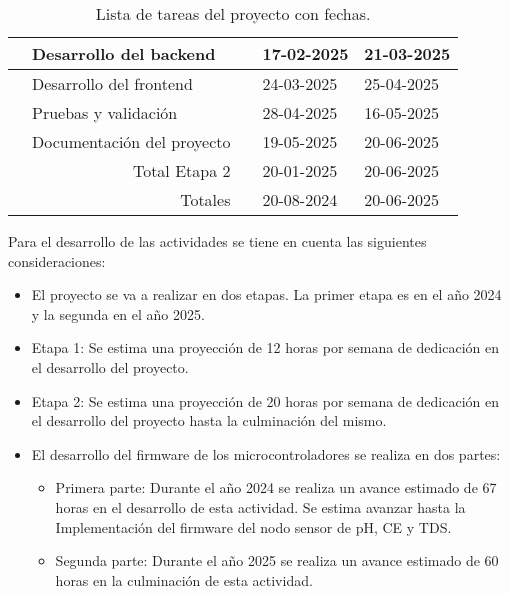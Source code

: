 \begin{table}[ht]
\begin{tabularx}{\linewidth}{|p{0.8cm}|p{8.33cm}|p{1cm}|p{1.8cm}|p{1.8cm}|}
		\centering{5}                       & Desarrollo del backend                            & \raggedleft{90} & 17-02-2025 & 21-03-2025 \\ \hline
		\centering{6}                       & Desarrollo del frontend                           & \raggedleft{93} & 24-03-2025 & 25-04-2025 \\ \hline
		\centering{7}                       & Pruebas y validación                              & \raggedleft{48} & 28-04-2025 & 16-05-2025 \\ \hline
		\centering{8}                       & Documentación del proyecto                        & \raggedleft{97} & 19-05-2025 & 20-06-2025 \\ \hline
		\multicolumn{2}{|r|}{Total Etapa 2} & \raggedleft{388}                                  & 20-01-2025      & 20-06-2025              \\ \hline
		\multicolumn{2}{|r|}{Totales}       & \raggedleft{615}                                  & 20-08-2024      & 20-06-2025              \\ \hline
	\end{tabularx}
	\caption{Lista de tareas del proyecto con fechas.}
	\label{tab:tabGantt}
\end{table}

Para el desarrollo de las actividades se tiene en cuenta las siguientes
consideraciones:

\begin{itemize}
	\item El proyecto se va a realizar en dos etapas. La primer etapa es en el año 2024 y
	      la segunda en el año 2025.
	\item Etapa 1: Se estima una proyección de 12 horas por semana de dedicación en el
	      desarrollo del proyecto.
	\item Etapa 2: Se estima una proyección de 20 horas por semana de dedicación en el
	      desarrollo del proyecto hasta la culminación del mismo.
	\item El desarrollo del firmware de los microcontroladores se realiza en dos partes:
	      \begin{itemize}
		      \item Primera parte: Durante el año 2024 se realiza un avance estimado de 67 horas en
		            el desarrollo de esta actividad. Se estima avanzar hasta la Implementación del
		            firmware del nodo sensor de pH, CE y TDS.
		      \item Segunda parte: Durante el año 2025 se realiza un avance estimado de 60 horas en
		            la culminación de esta actividad.
	      \end{itemize}

\end{itemize}

